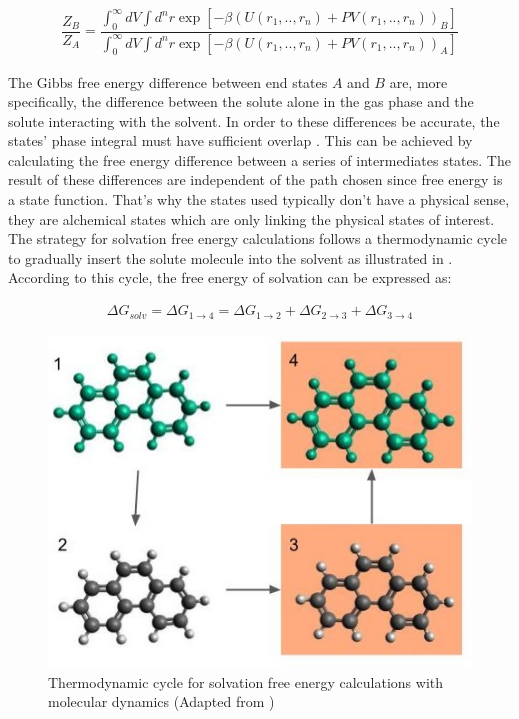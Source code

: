 \begin{equation}
\label{eq:partiso}
\begin{aligned}
\dfrac{Z_{B}}{Z_{A}} = \dfrac{\int_{0}^{\infty} dV \int d^{n}r \exp \left[ -\beta \left(U(r_{1},..,r_{n}) + PV(r_{1},..,r_{n}) \right)_{B} \right]}{\int_{0}^{\infty} dV \int d^{n}r \exp \left[ -\beta \left(U(r_{1},..,r_{n}) + PV(r_{1},..,r_{n}) \right)_{A} \right]}
\end{aligned}
\end{equation}

The Gibbs free energy difference between end states $A$ and $B$ are, more specifically, the difference between the solute alone in the gas phase and the solute interacting with the solvent. In order to these differences be accurate, the states' phase integral must have sufficient overlap  \cite{klimovich}. This can be achieved by calculating the free energy difference between a series of intermediates states. The result of these differences are independent of the path chosen since free energy is a state function. That's why the states used typically don't have a physical sense, they are alchemical states which are only linking the physical states of interest. The strategy for solvation free energy calculations follows a thermodynamic cycle to gradually insert the solute molecule into the solvent as illustrated in . According to this cycle, the free energy of solvation can be expressed as:

\begin{equation}
\label{eq:freesolv}
\begin{aligned}
\Delta G_{solv} = \Delta G_{1 \rightarrow 4} = \Delta G_{1 \rightarrow 2} + \Delta G_{2 \rightarrow 3} + \Delta G_{3 \rightarrow 4}  
\end{aligned}
\end{equation}

\begin{figure}[th]
	\centering
	\includegraphics[scale=0.6]{Figures/cicclotermo.jpg}
	\caption{Thermodynamic cycle for solvation free energy calculations with molecular dynamics (Adapted from )}
	\label{thermcy}
\end{figure}

